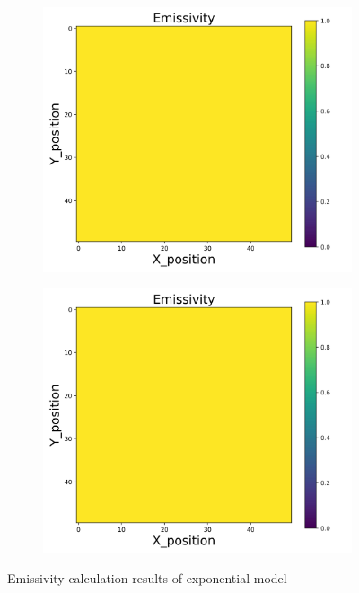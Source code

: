 {\begin{figure}[h]
\begin{minipage}{\textwidth}
\begin{subfigure}{0.27\textwidth}
        \end{subfigure}
        \begin{subfigure}{0.27\textwidth}
            \centering
            \includegraphics[width=\textwidth]{figures/raw_data/32/T3500/exp/emi_cal.jpg}
        \end{subfigure}
        \begin{subfigure}{0.27\textwidth}
            \centering
            \includegraphics[width=\textwidth]{figures/raw_data/33/T3500/exp/emi_cal.jpg}
        \end{subfigure}
    \end{minipage}
    \caption{Emissivity calculation results of exponential model}  
\end{figure}
}
